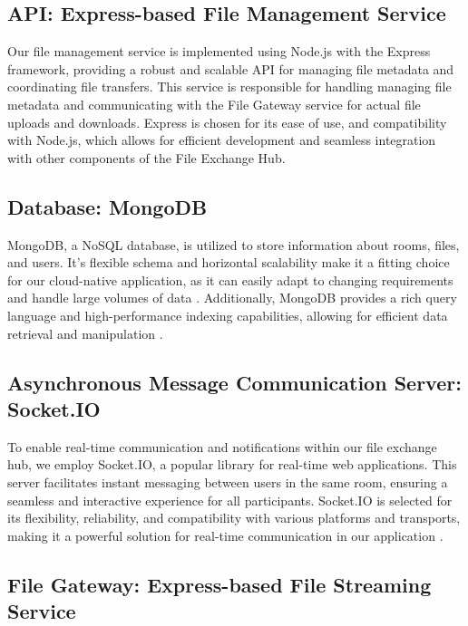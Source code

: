 \documentclass[a4paper,fleqn]{cas-dc}
\begin{document}
\subsection{API: Express-based File Management Service}

Our file management service is implemented using Node.js with the Express framework, providing a robust and scalable API for managing file metadata and coordinating file transfers. This service is responsible for handling managing file metadata and communicating with the File Gateway service for actual file uploads and downloads. Express is chosen for its ease of use, and compatibility with Node.js, which allows for efficient development and seamless integration \cite{Poulter2015} with other components of the File Exchange Hub.

\subsection{Database: MongoDB}

MongoDB, a NoSQL database, is utilized to store information about rooms, files, and users. It's flexible schema and horizontal scalability make it a fitting choice for our cloud-native application, as it can easily adapt to changing requirements and handle large volumes of data \cite{Boicea2012}. Additionally, MongoDB provides a rich query language and high-performance indexing capabilities, allowing for efficient data retrieval and manipulation \cite{Wang2014}.

\subsection{Asynchronous Message Communication Server: Socket.IO}

To enable real-time communication and notifications within our file exchange hub, we employ Socket.IO, a popular library for real-time web applications. This server facilitates instant messaging between users in the same room, ensuring a seamless and interactive experience for all participants. Socket.IO is selected for its flexibility, reliability, and compatibility with various platforms and transports, making it a powerful solution for real-time communication in our application \cite{Ray2020}.

\subsection{File Gateway: Express-based File Streaming Service}
\end{document}
